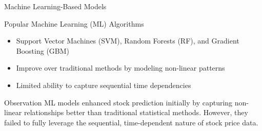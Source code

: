 \begin{frame}[label=mlmodels]{Machine Learning-Based Models}

    \begin{block}{Popular Machine Learning (ML) Algorithms}
        \begin{itemize}
            \item Support Vector Machines (SVM), Random Forests (RF), and Gradient Boosting (GBM)
            \item Improve over traditional methods by \alert{modeling non-linear patterns}
            \item \alert{Limited ability to capture sequential time dependencies}
        \end{itemize}
    \end{block}

    \begin{exampleblock}{Observation}
        ML models enhanced stock prediction initially by capturing non-linear relationships better than traditional 
        statistical methods. However, they failed to fully leverage the sequential, time-dependent nature of stock 
        price data.
    \end{exampleblock}


\end{frame}

